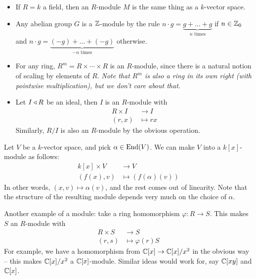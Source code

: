 \documentclass{../template/note}
\begin{document}
    \begin{example*}
        \begin{itemize}
            \item If $R = k$ a field, then an $R$-module $M$ is the same thing as a $k$-vector space.
            \item Any abelian group $G$ is a $\mathbb Z$-module by the rule $n \cdot g = \underbrace{g+\dots+g}_{n \text{ times}}$ if $n \in \mathbb Z_0$ and $n \cdot g = \underbrace{(-g)+\dots+(-g)}_{-n \text{ times}}$ otherwise.
            \item For any ring, $R^m = R \times \cdots \times R$ is an $R$-module, since there is a natural notion of scaling by elements of $R$. \emph{Note that $R^m$ is also a ring in its own right (with pointwise multiplication), but we don't care about that.}
            \item Let $I \triangleleft R$ be an ideal, then $I$ is an $R$-module with
            \begin{align*}
                R \times I &\to I \\
                (r, x) &\mapsto rx
            \end{align*}
            Similarly, $R/I$ is also an $R$-module by the obvious operation.            
        \end{itemize}
    \end{example*}
    
    \begin{example*}
        Let $V$ be a $k$-vector space, and pick $\alpha \in \operatorname{End}(V)$. We can make $V$ into a $k[x]$-module as follows:
        \begin{align*}
            k[x] \times V &\to V \\
            (f(x), v) &\mapsto (f(\alpha)(v))
        \end{align*}
        In other words, $(x, v) \mapsto \alpha(v)$, and the rest comes out of linearity. Note that the structure of the resulting module depends very much on the choice of $\alpha$.        
    \end{example*}
    
    \begin{example*}
        Another example of a module: take a ring homomorphism $\varphi: R \to S$. This makes $S$ an $R$-module with
        \begin{align*}
            R \times S &\to S \\
            (r, s) &\mapsto \varphi(r)S
        \end{align*}
        For example, we have a homomorphism from $\mathbb C[x] \to \mathbb C[x]/x^2$ in the obvious way -- this makes $\mathbb C[x]/x^2$ a $\mathbb C[x]$-module. Similar ideas would work for, say $\mathbb C[xy]$ and $\mathbb C[x]$.        
    \end{example*}
    
\end{document}
